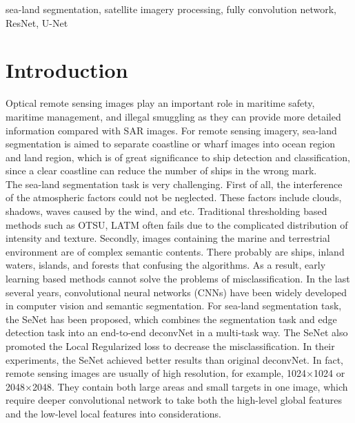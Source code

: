 \documentclass[conference]{IEEEtran}
\begin{document}
\begin{IEEEkeywords}
sea-land segmentation, satellite imagery processing, fully convolution network, ResNet, U-Net
\end{IEEEkeywords}

\section{Introduction}

Optical remote sensing images play an important role in maritime safety, maritime management, and illegal smuggling as they can provide more detailed information compared with SAR images. For remote sensing imagery, sea-land segmentation is aimed to separate coastline or wharf images into ocean region and land region, which is of great significance to ship detection and classification, since a clear coastline can reduce the number of ships in the wrong mark.\\

The sea-land segmentation task is very challenging. First of all, the interference of the atmospheric factors could not be neglected. These factors include clouds, shadows, waves caused by the wind, and etc. Traditional thresholding based methods such as OTSU\cite{b1}, LATM\cite{b2} often fails due to the complicated distribution of intensity and texture. Secondly, images containing the marine and terrestrial environment are of complex semantic contents. There probably are ships, inland waters, islands, and forests that confusing the algorithms. As a result,  early learning based methods cannot solve the problems of misclassification.  In the last several years, convolutional neural networks (CNNs) have been widely developed in computer vision and semantic segmentation. For sea-land segmentation task, the SeNet\cite{b3} has been proposed, which combines the segmentation task and edge detection task into an end-to-end deconvNet\cite{b4} in a multi-task way. The SeNet also promoted the Local Regularized loss to decrease the misclassification. In their experiments, the SeNet achieved better results than original deconvNet. In fact, remote sensing images are usually of high resolution, for example, 1024$\times$1024 or 2048$\times$2048. They contain both large areas and small targets in one image, which require deeper convolutional network to take both the high-level global features and the low-level local features into considerations.\\
\end{document}
